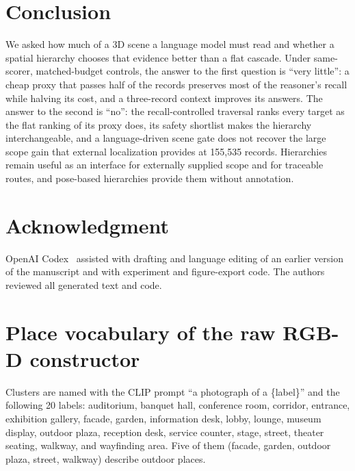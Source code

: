 \documentclass{ieeeaccess}
\begin{document}
\section{Conclusion}
We asked how much of a 3D scene a language model must read and whether a spatial
hierarchy chooses that evidence better than a flat cascade. Under same-scorer,
matched-budget controls, the answer to the first question is ``very little'': a
cheap proxy that passes half of the records preserves most of the reasoner's
recall while halving its cost, and a three-record context improves its answers. The
answer to the second is ``no'': the recall-controlled traversal ranks every target as the flat ranking of
its proxy does, its safety shortlist makes the hierarchy
interchangeable, and a language-driven scene gate does not recover the large scope
gain that external localization provides at 155,535 records. Hierarchies remain
useful as an interface for externally supplied scope and for traceable routes,
and pose-based hierarchies provide them without annotation.

\section*{Acknowledgment}
OpenAI Codex~\cite{openai2025codex} assisted with drafting and language editing of
an earlier version of the manuscript and with experiment and figure-export code.
The authors reviewed all generated text and code.

\appendices
\section{Place vocabulary of the raw RGB-D constructor}
\label{app:vocab}
Clusters are named with the CLIP prompt ``a photograph of a \{label\}'' and the
following 20 labels: auditorium, banquet hall, conference room, corridor,
entrance, exhibition gallery, facade, garden, information desk, lobby, lounge,
museum display, outdoor plaza, reception desk, service counter, stage, street,
theater seating, walkway, and wayfinding area. Five of them (facade, garden,
outdoor plaza, street, walkway) describe outdoor places.




\EOD
\end{document}
